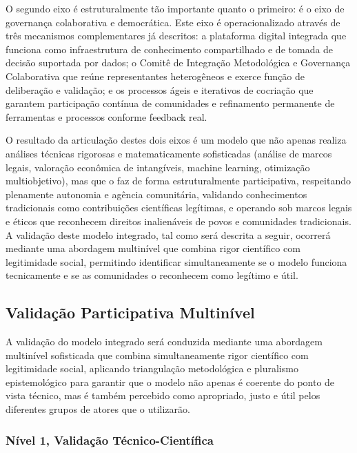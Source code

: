 O segundo eixo é estruturalmente tão importante quanto o primeiro: é o eixo de governança colaborativa e democrática. Este eixo é operacionalizado através de três mecanismos complementares já descritos: a plataforma digital integrada que funciona como infraestrutura de conhecimento compartilhado e de tomada de decisão suportada por dados; o Comitê de Integração Metodológica e Governança Colaborativa que reúne representantes heterogêneos e exerce função de deliberação e validação; e os processos ágeis e iterativos de cocriação que garantem participação contínua de comunidades e refinamento permanente de ferramentas e processos conforme feedback real.

O resultado da articulação destes dois eixos é um modelo que não apenas realiza análises técnicas rigorosas e matematicamente sofisticadas (análise de marcos legais, valoração econômica de intangíveis, machine learning, otimização multiobjetivo), mas que o faz de forma estruturalmente participativa, respeitando plenamente autonomia e agência comunitária, validando conhecimentos tradicionais como contribuições científicas legítimas, e operando sob marcos legais e éticos que reconhecem direitos inalienáveis de povos e comunidades tradicionais. A validação deste modelo integrado, tal como será descrita a seguir, ocorrerá mediante uma abordagem multinível que combina rigor científico com legitimidade social, permitindo identificar simultaneamente se o modelo funciona tecnicamente e se as comunidades o reconhecem como legítimo e útil.

\subsection{Validação Participativa Multinível}

A validação do modelo integrado será conduzida mediante uma abordagem multinível sofisticada que combina simultaneamente rigor científico com legitimidade social, aplicando triangulação metodológica e pluralismo epistemológico para garantir que o modelo não apenas é coerente do ponto de vista técnico, mas é também percebido como apropriado, justo e útil pelos diferentes grupos de atores que o utilizarão.

\subsubsection{Nível 1, Validação Técnico-Científica}

